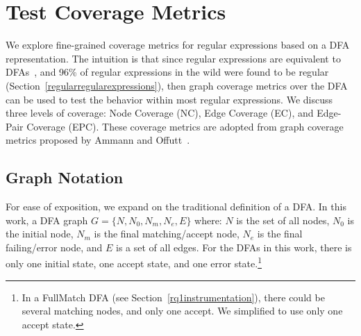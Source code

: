 

\section{Test Coverage Metrics}
\label{sec:coverage}
We explore fine-grained coverage metrics for regular expressions based on a DFA representation. 
The intuition is that since regular expressions are equivalent to DFAs~\cite{sipser2006introduction}, and 96\% of regular expressions in the wild were found to be regular (Section~\ref{regularregularexpressions}), then graph coverage metrics over the DFA can be used to test the behavior within most regular expressions.  
We discuss three levels of coverage: Node Coverage (NC), Edge Coverage (EC), and Edge-Pair Coverage (EPC). These coverage metrics are adopted from graph coverage metrics proposed by Ammann and Offutt~\cite[Chapter 7]{ammann2016introduction}. 

\subsection{Graph Notation} 
For ease of exposition, we expand on the traditional definition of a DFA. In this work, a DFA graph $G = \{N, N_0, N_m, N_e, E\}$ where: $N$ is the set of all nodes, $N_0$ is the initial node, $N_m$ is the final matching/accept node, $N_e$ is the final failing/error node, and $E$ is a set of all edges. 
For the DFAs in this work, there is only one initial state, one accept state, and one error state.\footnote{In a FullMatch DFA (see Section~\ref{rq1instrumentation}), there could be several matching nodes, and only one accept. We simplified to use only one accept state.}

